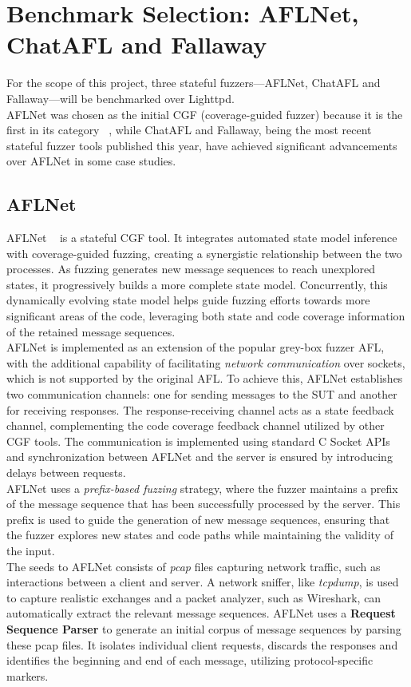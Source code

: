 \section{Benchmark Selection: AFLNet, ChatAFL and Fallaway}

For the scope of this project, three stateful fuzzers—AFLNet, ChatAFL and Fallaway—will be benchmarked over Lighttpd.
\\AFLNet was chosen as the initial CGF (coverage-guided fuzzer) because it is the first in its category ~\cite{AFLNet}, while ChatAFL and Fallaway, being the most recent stateful fuzzer tools published this year, have achieved significant advancements over AFLNet in some case studies.
 
\subsection{AFLNet}
AFLNet ~\cite{AFLNet} is a stateful CGF tool. It integrates automated state model inference with coverage-guided fuzzing, creating a synergistic relationship between the two processes. As fuzzing generates new message sequences to reach unexplored states, it progressively builds a more complete state model. Concurrently, this dynamically evolving state model helps guide fuzzing efforts towards more significant areas of the code, leveraging both state and code coverage information of the retained message sequences.
\\AFLNet is implemented as an extension of the popular grey-box fuzzer AFL, with the additional capability of facilitating \textit{network communication} over sockets, which is not supported by the original AFL. To achieve this, AFLNet establishes two communication channels: one for sending messages to the SUT and another for receiving responses. The response-receiving channel acts as a state feedback channel, complementing the code coverage feedback channel utilized by other CGF tools. The communication is implemented using standard C Socket APIs and synchronization between AFLNet and the server is ensured by introducing delays between requests.
\\AFLNet uses a \textit{prefix-based fuzzing} strategy, where the fuzzer maintains a prefix of the message sequence that has been successfully processed by the server. This prefix is used to guide the generation of new message sequences, ensuring that the fuzzer explores new states and code paths while maintaining the validity of the input.
\\The seeds to AFLNet consists of \textit{pcap} files capturing network traffic, such as interactions between a client and server. A network sniffer, like \textit{tcpdump}, is used to capture realistic exchanges and a packet analyzer, such as Wireshark, can automatically extract the relevant message sequences. AFLNet uses a \textbf{Request Sequence Parser} to generate an initial corpus of message sequences by parsing these pcap files. It isolates individual client requests, discards the responses and identifies the beginning and end of each message, utilizing protocol-specific markers.
